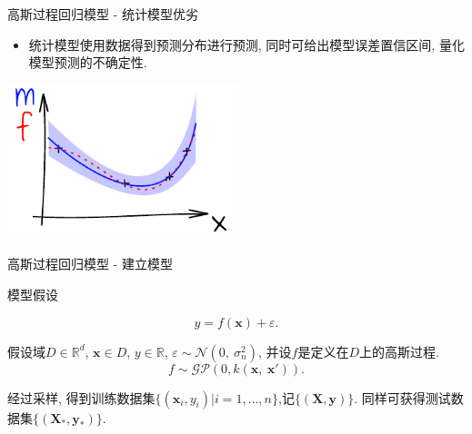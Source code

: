 \begin{frame}{高斯过程回归模型 - 统计模型优劣}
    \begin{itemize}
        \item 统计模型使用数据得到预测分布进行预测, 同时可给出模型误差置信区间, 量化模型预测的不确定性.
    \end{itemize}

    \begin{center}
        \includegraphics[height=4.5cm]{./fig/ink_mconfint}
    \end{center}
\end{frame}

\begin{frame}[fragile]{高斯过程回归模型 - 建立模型}

    模型假设
    
    $$y=f(\boldsymbol{x})+\varepsilon.$$

    假设域$D\in\mathds{R}^{d}$, $\boldsymbol{x}\in D$, $y\in\mathds{R}$, $\varepsilon\sim\mathcal{N}(0,\ \sigma^{2}_{n})$, 并设$f$是定义在$D$上的高斯过程.
        $$f\sim\mathcal{GP}\left(0, k(\boldsymbol{x},\ \boldsymbol{x}')\right).$$

    经过采样, 得到训练数据集$\{(\boldsymbol{x}_{i},y_{i})|i=1,\dots,n\}$,记$\{(\boldsymbol{X}, \boldsymbol{y})\}$. 同样可获得测试数据集$\{(\boldsymbol{X}_{*}, \boldsymbol{y}_{*})\}$.
\end{frame}

